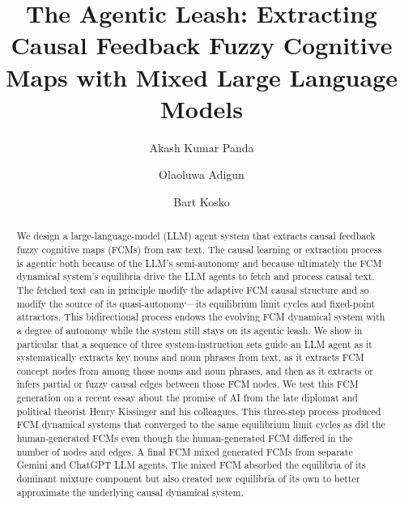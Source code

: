 \documentclass[runningheads]{llncs}
\begin{document}
%
\title{The Agentic Leash:  Extracting Causal Feedback Fuzzy Cognitive Maps with Mixed Large Language Models}
%
%
\author{Akash Kumar Panda  \and
Olaoluwa Adigun  \and
Bart Kosko }
%
%
%
\maketitle              %
%
\begin{abstract}
We design a large-language-model (LLM) agent system that extracts causal feedback fuzzy cognitive maps (FCMs) from raw text.
The causal learning or extraction process is agentic both because of the LLM's semi-autonomy and because ultimately the FCM dynamical system's equilibria drive the LLM agents to fetch and process causal text.
The fetched text can in principle modify the adaptive FCM causal structure and so modify the source of its quasi-autonomy---its equilibrium limit cycles and fixed-point attractors. 
This bidirectional process endows the evolving FCM dynamical system with a degree of autonomy while the system still stays on its agentic leash.
We show in particular that a sequence of three system-instruction sets guide an LLM agent as it systematically extracts key nouns and noun phrases from text, as it extracts FCM concept nodes from among those nouns and noun phrases, and then as it extracts or infers partial or fuzzy causal edges between those FCM nodes. 
We test this FCM generation on a recent essay about the promise of AI from the late diplomat and political theorist Henry Kissinger and his colleagues.
This three-step process produced FCM dynamical systems that converged to the same equilibrium limit cycles as did the human-generated FCMs even though the human-generated FCM differed in the number of nodes and edges. 
A final FCM mixed generated FCMs from separate Gemini and ChatGPT LLM agents.  
The mixed FCM absorbed the equilibria of its dominant mixture component but also created new equilibria of its own to better approximate the underlying causal dynamical system.
\end{abstract}
\end{document}
